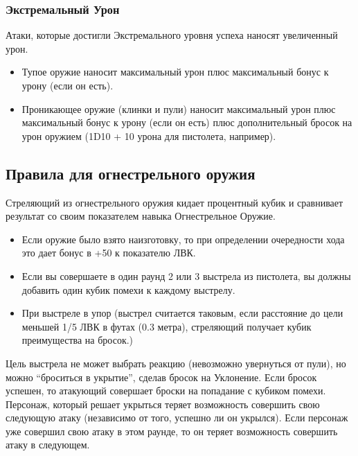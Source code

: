 \documentclass[letterpaper,twocolumn,openany, twoside, 11pt, usenames]{cocbook}
\begin{document}
\subsubsection*{Экстремальный Урон}

Атаки, которые достигли Экстремального уровня успеха наносят увеличенный урон.

\begin{itemize}[leftmargin=4mm]
  \item Тупое оружие наносит максимальный урон плюс максимальный бонус к урону (если он есть).
  \item Проникающее оружие (клинки и пули) наносит максимальный урон плюс максимальный бонус к урону (если он есть) плюс дополнительный бросок на урон оружием (1D10 + 10 урона для пистолета, например).
\end{itemize}

\smallbreak
\noindent {}
\smallbreak

\subsection*{Правила для огнестрельного оружия}

Стреляющий из огнестрельного оружия кидает процентный кубик и сравнивает результат со своим показателем навыка Огнестрельное Оружие.

\begin{itemize}[leftmargin=4mm]
  \item Если оружие было взято наизготовку, то при определении очередности хода это дает бонус в +50 к показателю ЛВК.
  \item Если вы совершаете в один раунд 2 или 3 выстрела из пистолета, вы должны добавить один кубик помехи к каждому выстрелу.
  \item При выстреле в упор (выстрел считается таковым, если расстояние до цели меньшей 1/5 ЛВК в футах (0.3 метра), стреляющий получает кубик преимущества на бросок.)
\end{itemize}

Цель выстрела не может выбрать реакцию (невозможно увернуться от пули), но можно ``броситься в укрытие'', сделав бросок на Уклонение. Если бросок успешен, то атакующий совершает броски на попадание с кубиком помехи. Персонаж, который решает укрыться теряет возможность совершить свою следующую атаку (независимо от того, успешно ли он укрылся). Если персонаж уже совершил свою атаку в этом раунде, то он теряет возможность совершить атаку в следующем.
\end{document}
